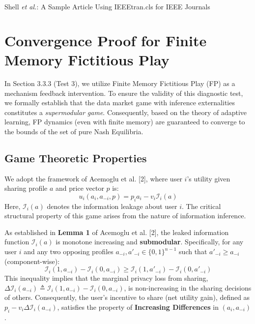 \documentclass[lettersize,journal]{IEEEtran}
\begin{document}
%
{Shell \MakeLowercase{\textit{et al.}}: A Sample Article Using IEEEtran.cls for IEEE Journals}


\maketitle

\appendices
\appendix
\section{Convergence Proof for Finite Memory Fictitious Play}
\label{app:fp_proof}

In Section 3.3.3 (Test 3), we utilize Finite Memory Fictitious Play (FP) as a mechanism feedback intervention. To ensure the validity of this diagnostic test, we formally establish that the data market game with inference externalities constitutes a \textit{supermodular game}. Consequently, based on the theory of adaptive learning, FP dynamics (even with finite memory) are guaranteed to converge to the bounds of the set of pure Nash Equilibria.

\subsection{Game Theoretic Properties}

We adopt the framework of Acemoglu et al. [2], where user $i$'s utility given sharing profile $a$ and price vector $p$ is:
\begin{equation}
    u_i(a_i, a_{-i}, p) = p_i a_i - v_i \mathcal{I}_i(a)
\end{equation}
Here, $\mathcal{I}_i(a)$ denotes the information leakage about user $i$. The critical structural property of this game arises from the nature of information inference.

\begin{lemma}
\label{lemma:submodularity}
As established in \textbf{Lemma 1} of Acemoglu et al. [2], the leaked information function $\mathcal{I}_i(a)$ is monotone increasing and \textbf{submodular}. Specifically, for any user $i$ and any two opposing profiles $a_{-i}, a'_{-i} \in \{0,1\}^{n-1}$ such that $a'_{-i} \geq a_{-i}$ (component-wise):
\begin{equation}
    \mathcal{I}_i(1, a_{-i}) - \mathcal{I}_i(0, a_{-i}) \geq \mathcal{I}_i(1, a'_{-i}) - \mathcal{I}_i(0, a'_{-i})
\end{equation}
This inequality implies that the marginal privacy loss from sharing, $\Delta \mathcal{I}_i(a_{-i}) \triangleq \mathcal{I}_i(1, a_{-i}) - \mathcal{I}_i(0, a_{-i})$, is non-increasing in the sharing decisions of others. Consequently, the user's incentive to share (net utility gain), defined as $p_i - v_i \Delta \mathcal{I}_i(a_{-i})$, satisfies the property of \textbf{Increasing Differences} in $(a_i, a_{-i})$.
\end{lemma}
\end{document}
